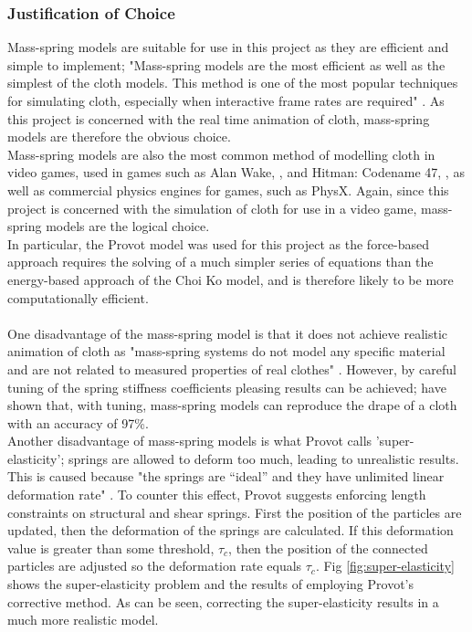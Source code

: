 \subsubsection{Justification of Choice}
Mass-spring models are suitable for use in this project as they are efficient and simple to implement; "Mass-spring models are the most efficient as well as the simplest of the cloth models.  This method is one of the most popular techniques for simulating cloth, especially when interactive frame rates are required" \parencite[2]{Zink2007}. As this project is concerned with the real time animation of cloth, mass-spring models are therefore the obvious choice.
\\Mass-spring models are also the most common method of modelling cloth in video games, used in games such as Alan Wake, \parencite[2]{Enqvist2010}, and Hitman: Codename 47, \parencite[1]{Jakobsen2005}, as well as commercial physics engines for games, such as PhysX. Again, since this project is concerned with the simulation of cloth for use in a video game, mass-spring models are the logical choice.
\\In particular, the Provot model was used for this project as the force-based approach requires the solving of a much simpler series of equations than the energy-based approach of the Choi Ko model, and is therefore likely to be more computationally efficient.
\\\\One disadvantage of the mass-spring model is that it does not achieve realistic animation of cloth as "mass-spring systems do not model any specific material and are not related to measured properties of real clothes" \parencite[3]{Wacker2005a}. However, by careful tuning of the spring stiffness coefficients pleasing results can be achieved; \textcite{Mongus2012} have shown that, with tuning, mass-spring models can reproduce the drape of a cloth with an accuracy of 97\%.
\\Another disadvantage of mass-spring models is what Provot calls 'super-elasticity'; springs are allowed to deform too much, leading to unrealistic results. This is caused because "the springs are “ideal” and they have unlimited linear deformation rate" \parencite[3]{Vassilev2001}. To counter this effect, Provot suggests enforcing length constraints on structural and shear springs. First the position of the particles are updated, then the deformation of the springs are calculated. If this deformation value is greater than some threshold, $\tau_{c}$, then the position of the connected particles are adjusted so the deformation rate equals $\tau_{c}$. Fig \ref{fig:super-elasticity} shows the super-elasticity problem and the results of employing Provot's corrective method. As can be seen, correcting the super-elasticity results in a much more realistic model.

